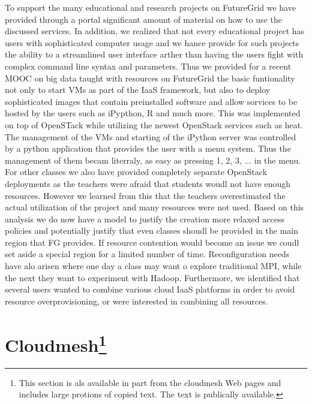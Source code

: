 \documentclass{article}
\newcommand{\FILE}[1]{\todo[color=green!40]{#1}}
\begin{document}
To support the many educational and research projects on FutureGrid we have provided through a portal significant amount of material on how to use the discussed services. In addition, we realized that not every educational project has users with sophisticated computer usage and we hance provide for such projects the ability to a streamlined user interface arther than having the users fight with complex command line syntax and parameters. Thus we provided for a recent MOOC on big data taught with resources on FutureGrid the basic funtionality not only to start VMs as part of the IaaS framework, but also to deploy sophisticated images that contain preinstalled software and allow sorvices to be hosted by the users such as iPypthon, R and much more. This was implemented on top of OpenSTack while utilizing the newest OpenStack services such as heat. The management of the VMs and starting of the iPython server was controlled by a python application that provides the user with a menu system. Thus the management of them becam literraly, as easy as pressing 1, 2, 3, ... in the menu.
For other classes we also have provided completely separate OpenStack deployments as the teachers were afraid that students woudl not have enough resources. However we learned from this that the teachers overestimated the actual utilization of the project and many resources were not used. Based on this analysis we do now have a model to justify the creation more relaxed access policies and potentially justify that even classes shoudl be provided in the main region that FG provides. If resource contention would become an issue we coudl set aside a special region for a limited number of time.
Reconfiguration needs have alo arisen where one day a class may want o explore traditional MPI, while the next they want to experiment with Hadoop.
Furthermore, we identified that several users wanted to combine various cloud IaaS platforms in order to avoid resource overprovisioning, or were interested in combining all resources. 



\FILE{cloudmesh.tex}

\section{Cloudmesh\footnote{This section is als available in part from
  the cloudmesh Web pages and includes large protions of copied
  text. The text is publically available.}}\label{S:cloudmesh}
\end{document}
